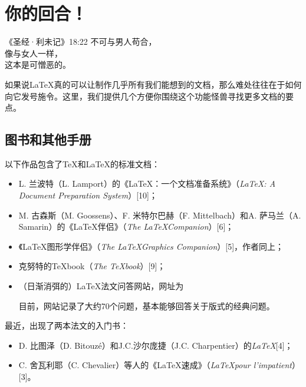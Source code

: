 \chapter{你的回合！}

\begin{epigraphe}{《圣经·利未记》18:22}
    不可与男人苟合，\\像与女人一样，\\这本是可憎恶的。
\end{epigraphe}

如果说\LaTeX 真的可以让制作几乎所有我们能想到的文档，那么难处往往在于如何向它发号施令。这里，我们提供几个方便你围绕这个功能怪兽寻找更多文档的要点。

\section{图书和其他手册}

以下作品包含了\TeX 和\LaTeX 的标准文档：

\begin{itemize}
    \item L. 兰波特（L. Lamport）的《\LaTeX ：一个文档准备系统》（\emph{\LaTeX : A Document Preparation System}）[10]；
    \item M. 古森斯（M. Goossens）、F. 米特尔巴赫（F. Mittelbach）和A. 萨马兰（A. Samarin）的《\LaTeX 伴侣》（\emph{The \LaTeX  Companion}）[6]；
    \item 《\LaTeX 图形学伴侣》（\emph{The \LaTeX  Graphics Companion}）[5]，作者同上；
    \item 克努特的\TeX book（\emph{The \TeX book}）[9]；
    \item （日渐消弭的）\LaTeX 法文问答网站，网址为
    
    \begin{center}
    \end{center}

    目前，网站记录了大约70个问题，基本能够回答关于版式的经典问题。
\end{itemize}

最近，出现了两本法文的入门书：

\begin{itemize}
    \item D. 比图泽（D. Bitouzé）和J.C.沙尔庞捷（J.C. Charpentier）的\emph{\LaTeX }[4]；
    \item C. 舍瓦利耶（C. Chevalier）等人的《\LaTeX 速成》（\emph{\LaTeX  pour l'impatient}）[3]。
\end{itemize}

